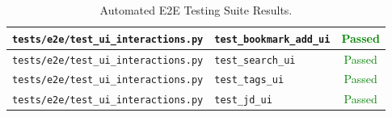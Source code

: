 \begin{table}[H]
\begin{tabular}{|l|l|c|}
    \hline
    \texttt{tests/e2e/test\_ui\_interactions.py} & \texttt{test\_bookmark\_add\_ui} & \textcolor{green}{Passed} \\
    \hline
    \texttt{tests/e2e/test\_ui\_interactions.py} & \texttt{test\_search\_ui} & \textcolor{green}{Passed} \\
    \hline
    \texttt{tests/e2e/test\_ui\_interactions.py} & \texttt{test\_tags\_ui} & \textcolor{green}{Passed} \\
    \hline
    \texttt{tests/e2e/test\_ui\_interactions.py} & \texttt{test\_jd\_ui} & \textcolor{green}{Passed} \\
    \hline
  \end{tabular}
  \caption{Automated E2E Testing Suite Results.}
  \label{tab:e2e-test-results}
\end{table}
